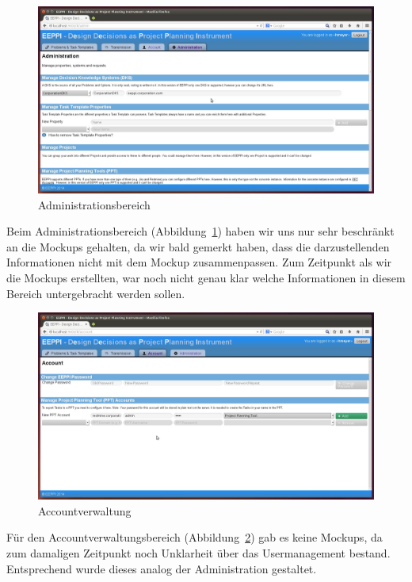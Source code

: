 		
		\begin{figure}[H]
			\centering
			\includegraphics[width=\linewidth]{tutorial/img/administrationDKS.jpg}
			\caption{Administrationsbereich}
			\label{fig:eeppiAdministration}
		\end{figure}	
		
		Beim Administrationsbereich (Abbildung\ \ref{fig:eeppiAdministration}) haben wir uns nur sehr beschränkt an die Mockups gehalten, 
		da wir bald gemerkt haben, dass die darzustellenden Informationen nicht mit dem Mockup zusammenpassen.
		Zum Zeitpunkt als wir die Mockups erstellten, 
		war noch nicht genau klar welche Informationen in diesem Bereich untergebracht werden sollen.		
		
		
		\begin{figure}[H]
			\centering
			\includegraphics[width=\linewidth]{tutorial/img/accountPPTAccount.jpg}
			\caption{Accountverwaltung}
			\label{fig:eeppiAccountManagement}
		\end{figure}	
		
		Für den Accountverwaltungsbereich (Abbildung\ \ref{fig:eeppiAccountManagement}) gab es keine Mockups, da zum damaligen Zeitpunkt noch Unklarheit über das Usermanagement bestand.
		Entsprechend wurde dieses analog der Administration gestaltet.
		
